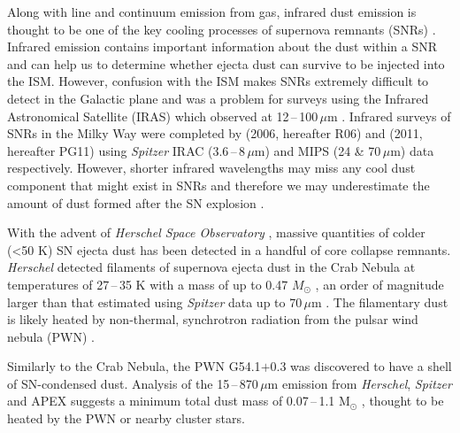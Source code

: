\documentclass[fleqn,usenatbib]{mnras}
\begin{document}
Along with line and continuum emission from gas, infrared dust emission is thought to be one of the key cooling processes of supernova remnants (SNRs) \citep{Dwek1987, Draine1981, Ostriker1973}. Infrared emission contains important information about the dust within a SNR and can help us to determine whether ejecta dust can survive to be injected into the ISM. However, confusion with the ISM makes SNRs extremely difficult to detect in the Galactic plane and was a problem for surveys using the Infrared Astronomical Satellite (IRAS) which observed at 12\,--\,100\,$\mu$m \citep{Saken1992, Arendt1989}. Infrared surveys of SNRs in the Milky Way were completed by \citeauthor{Reach2006} (2006, hereafter R06) and \citeauthor{Goncalves2011} (2011, hereafter PG11) using \textit{Spitzer} IRAC (3.6\,--\,8\,$\mu$m) and MIPS (24 \& 70\,$\mu$m) data respectively. However, shorter infrared wavelengths may miss any cool dust component that might exist in SNRs and therefore we may underestimate the amount of dust formed after the SN explosion \citep[e.g.][]{Barlow2010}.

With the advent of \textit{Herschel Space Observatory} \citep{Pilbratt2010}, massive quantities of colder (\textless 50 K) SN ejecta dust has been detected in a handful of core collapse remnants. \textit{Herschel} detected filaments of supernova ejecta dust in the Crab Nebula at temperatures of 27\,--\,35 K with a mass of up to 0.47 $M_\odot$ \citep{Gomez2012b, Owen2015}, an order of magnitude larger than that estimated using \textit{Spitzer} data up to 70\,$\mu$m \citep{Temim2012}. The filamentary dust is likely heated by non-thermal, synchrotron radiation from the pulsar wind nebula (PWN) \citep[e.g.][]{Davidson1985, MacAlpine2008}.

Similarly to the Crab Nebula, the PWN G54.1$+$0.3 was discovered to have a shell of SN-condensed dust. Analysis of the 15\,--\,870\,$\mu$m emission from \textit{Herschel},  \textit{Spitzer}  and APEX suggests a minimum total dust mass of 0.07\,--\,1.1 M$_\odot$ \citep{Temim2017, Rho2018}, thought to be heated by the PWN or nearby cluster stars.
\end{document}
